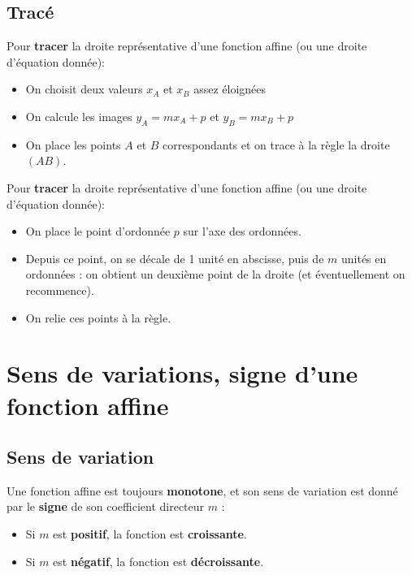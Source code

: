 \documentclass[a4paper,11pt]{article}
\begin{document}
\subsection{Tracé}

\begin{cmethode}[ 1]
Pour \textbf{tracer} la droite représentative d'une fonction affine (ou une droite d'équation donnée):
	\begin{itemize}
		\item On choisit deux valeurs $x_A$ et $x_B$ assez éloignées
		\item On calcule les images $y_A=mx_A+p$ et $y_B=mx_B+p$ 
		\item On place les points $A$ et $B$ correspondants et on trace à la règle la droite $(AB)$.
\end{itemize}
\end{cmethode}

\begin{cmethode}[ 2]
Pour \textbf{tracer} la droite représentative d'une fonction affine (ou une droite d'équation donnée):
	\begin{itemize}
		\item On place le point d'ordonnée $p$ sur l'axe des ordonnées.
		\item Depuis ce point, on se décale de 1 unité en abscisse, puis de $m$ unités en ordonnées : on obtient un deuxième point de la droite (et éventuellement on recommence).
		\item On relie ces points à la règle.
\end{itemize}
\end{cmethode}

\newpage

\section{Sens de variations, signe d'une fonction affine}

\subsection{Sens de variation}

\begin{cprop}
Une fonction affine est toujours \textbf{monotone}, et son sens de variation est donné par le \textbf{signe} de son coefficient directeur $m$ :
	\begin{itemize}
		\item Si $m$ est \textbf{positif}, la fonction est \textbf{croissante}.
		\item Si $m$ est \textbf{négatif}, la fonction est \textbf{décroissante}.
\end{itemize}
\end{cprop}
\end{document}
